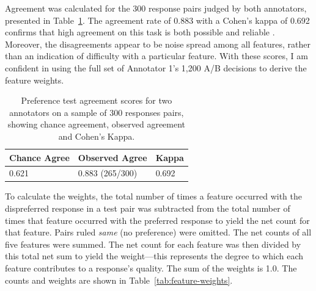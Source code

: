 Agreement was calculated for the 300 response pairs judged by both annotators, presented in Table~\ref{tab:preference-agreement}. The agreement rate of 0.883 with a Cohen's kappa of 0.692 confirms that high agreement on this task is both possible and reliable \citep{landis1977measurement, artstein:massimo:2008}. Moreover, the disagreements appear to be noise spread among all features, rather than an indication of difficulty with a particular feature. With these scores, I am confident in using the full set of Annotator 1's 1,200 A/B decisions to derive the feature weights.

\begin{table}[htb!]
\begin{center}
\begin{tabular}{|l|l|l|}
\hline
 Chance Agree & Observed Agree & Kappa \\
\hline
0.621 & 0.883 (265/300) & 0.692 \\
\hline
\end{tabular}
\caption{\label{tab:preference-agreement} Preference test agreement scores for two annotators on a sample of 300 responses pairs, showing chance agreement, observed agreement and Cohen's Kappa.}
\end{center}
\end{table}

To calculate the weights, the total number of times a feature occurred with the dispreferred response in a test pair was subtracted from the total number of times that feature occurred with the preferred response to yield the net count for that feature. Pairs ruled \textit{same} (no preference) were omitted. The net counts of all five features were summed. The net count for each feature was then divided by this total net sum to yield the weight---this represents the degree to which each feature contributes to a response's quality. The sum of the weights is 1.0. The counts and weights are shown in Table~\ref{tab:feature-weights}.

